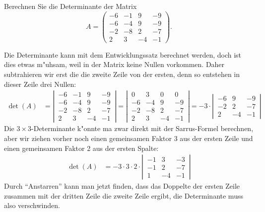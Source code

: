 Berechnen Sie die Determinante der Matrix
\[
A=\begin{pmatrix}
-6&-1& 9&-9\\
-6&-4& 9&-9\\
-2&-8& 2&-7\\
 2& 3&-4&-1
\end{pmatrix}.
\]

\begin{loesung}
Die Determinante kann mit dem Entwicklungssatz berechnet werden, doch
ist dies etwas m"uhsam, weil in der Matrix keine Nullen vorkommen.
Daher subtrahieren wir erst die die zweite Zeile von der ersten, denn
so entstehen in dieser Zeile drei Nullen:
\begin{align*}
\det(A)
&=
\left|\,\begin{matrix}
-6&-1& 9&-9\\
-6&-4& 9&-9\\
-2&-8& 2&-7\\
 2& 3&-4&-1
\end{matrix}\,\right|
=
\left|\,\begin{matrix}
 0& 3& 0& 0\\
-6&-4& 9&-9\\
-2&-8& 2&-7\\
 2& 3&-4&-1
\end{matrix}\,\right|
=
-3\cdot\left|\,\begin{matrix}
-6& 9&-9\\
-2& 2&-7\\
 2&-4&-1
\end{matrix}\,\right|
\end{align*}
Die $3\times 3$-Determinante k"onnte ma zwar direkt mit der
Sarrus-Formel berechnen, aber wir ziehen vorher noch einen gemeinsamen
Faktor 3 aus der ersten Zeile und einen gemeinsamen Faktor 2 aus der
ersten Spalte:
\begin{align}
\det(A)
&=
-3\cdot 3\cdot 2\cdot\left|\,\begin{matrix}
-1& 3&-3\\
-1& 2&-7\\
 1&-4&-1
\end{matrix}\,\right|
\label{20000037:3det}
\end{align}
Durch ``Anstarren'' kann man jetzt finden, dass das Doppelte der ersten
Zeile zusammen mit der dritten Zeile die zweite Zeile ergibt, die Determinante
muss also verschwinden.


\end{loesung}
